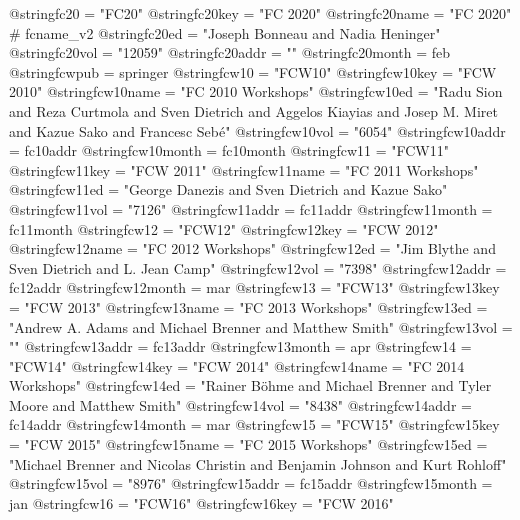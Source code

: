 @string{fc20 =                  "FC20"}
@string{fc20key =               "FC 2020"}
@string{fc20name =              "FC 2020" # fcname_v2}
@string{fc20ed =                "Joseph Bonneau and Nadia Heninger"}
@string{fc20vol =               "12059"}
@string{fc20addr =              ""}
@string{fc20month =             feb}
@string{fcwpub =                springer}
@string{fcw10 =                 "FCW10"}
@string{fcw10key =              "FCW 2010"}
@string{fcw10name =             "FC 2010 Workshops"}
@string{fcw10ed =               "Radu Sion and Reza Curtmola and Sven Dietrich and Aggelos Kiayias and Josep M. Miret and Kazue Sako and Francesc Seb{\'e}"}
@string{fcw10vol =              "6054"}
@string{fcw10addr =             fc10addr}
@string{fcw10month =            fc10month}
@string{fcw11 =                 "FCW11"}
@string{fcw11key =              "FCW 2011"}
@string{fcw11name =             "FC 2011 Workshops"}
@string{fcw11ed =               "George Danezis and Sven Dietrich and Kazue Sako"}
@string{fcw11vol =              "7126"}
@string{fcw11addr =             fc11addr}
@string{fcw11month =            fc11month}
@string{fcw12 =                 "FCW12"}
@string{fcw12key =              "FCW 2012"}
@string{fcw12name =             "FC 2012 Workshops"}
@string{fcw12ed =               "Jim Blythe and Sven Dietrich and L. Jean Camp"}
@string{fcw12vol =              "7398"}
@string{fcw12addr =             fc12addr}
@string{fcw12month =            mar}
@string{fcw13 =                 "FCW13"}
@string{fcw13key =              "FCW 2013"}
@string{fcw13name =             "FC 2013 Workshops"}
@string{fcw13ed =               "Andrew A. Adams and Michael Brenner and Matthew Smith"}
@string{fcw13vol =              ""}
@string{fcw13addr =             fc13addr}
@string{fcw13month =            apr}
@string{fcw14 =                 "FCW14"}
@string{fcw14key =              "FCW 2014"}
@string{fcw14name =             "FC 2014 Workshops"}
@string{fcw14ed =               "Rainer B{\"o}hme and Michael Brenner and Tyler Moore and Matthew Smith"}
@string{fcw14vol =              "8438"}
@string{fcw14addr =             fc14addr}
@string{fcw14month =            mar}
@string{fcw15 =                 "FCW15"}
@string{fcw15key =              "FCW 2015"}
@string{fcw15name =             "FC 2015 Workshops"}
@string{fcw15ed =               "Michael Brenner and Nicolas Christin and Benjamin Johnson and Kurt Rohloff"}
@string{fcw15vol =              "8976"}
@string{fcw15addr =             fc15addr}
@string{fcw15month =            jan}
@string{fcw16 =                 "FCW16"}
@string{fcw16key =              "FCW 2016"}
